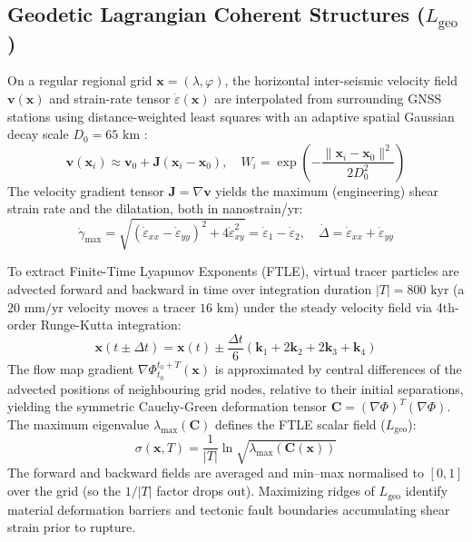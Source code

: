 \documentclass[11pt,a4paper]{article}
\begin{document}
\subsection{Geodetic Lagrangian Coherent Structures (\texorpdfstring{$L_{\text{geo}}$}{L\_geo})}
On a regular regional grid $\mathbf{x} = (\lambda, \varphi)$, the horizontal inter-seismic velocity field $\mathbf{v}(\mathbf{x})$ and strain-rate tensor $\dot{\varepsilon}(\mathbf{x})$ are interpolated from surrounding GNSS stations using distance-weighted least squares with an adaptive spatial Gaussian decay scale $D_0 = 65\text{ km}$ \cite{shen1996}:
\begin{equation}
\mathbf{v}(\mathbf{x}_i) \approx \mathbf{v}_0 + \mathbf{J} (\mathbf{x}_i - \mathbf{x}_0), \quad W_i = \exp\left( - \frac{\|\mathbf{x}_i - \mathbf{x}_0\|^2}{2 D_0^2} \right)
\end{equation}
The velocity gradient tensor $\mathbf{J} = \nabla \mathbf{v}$ yields the maximum (engineering) shear strain rate and the dilatation, both in nanostrain/yr:
\begin{equation}
\dot{\gamma}_{\max} = \sqrt{(\dot{\varepsilon}_{xx} - \dot{\varepsilon}_{yy})^2 + 4\dot{\varepsilon}_{xy}^2} = \dot{\varepsilon}_1 - \dot{\varepsilon}_2, \quad \dot{\Delta} = \dot{\varepsilon}_{xx} + \dot{\varepsilon}_{yy}
\end{equation}

To extract Finite-Time Lyapunov Exponents (FTLE), virtual tracer particles are advected forward and backward in time over integration duration $|T| = 800\text{ kyr}$ (a $20\text{ mm/yr}$ velocity moves a tracer $16\text{ km}$) under the steady velocity field via 4th-order Runge-Kutta integration:
\begin{equation}
\mathbf{x}(t \pm \Delta t) = \mathbf{x}(t) \pm \frac{\Delta t}{6}(\mathbf{k}_1 + 2\mathbf{k}_2 + 2\mathbf{k}_3 + \mathbf{k}_4)
\end{equation}
The flow map gradient $\nabla \Phi_{t_0}^{t_0+T}(\mathbf{x})$ is approximated by central differences of the advected positions of neighbouring grid nodes, relative to their initial separations, yielding the symmetric Cauchy-Green deformation tensor $\mathbf{C} = (\nabla \Phi)^T (\nabla \Phi)$. The maximum eigenvalue $\lambda_{\max}(\mathbf{C})$ defines the FTLE scalar field ($L_{\text{geo}}$):
\begin{equation}
\sigma(\mathbf{x}, T) = \frac{1}{|T|} \ln \sqrt{\lambda_{\max}(\mathbf{C}(\mathbf{x}))}
\end{equation}
The forward and backward fields are averaged and min--max normalised to $[0, 1]$ over the grid (so the $1/|T|$ factor drops out). Maximizing ridges of $L_{\text{geo}}$ identify material deformation barriers and tectonic fault boundaries accumulating shear strain prior to rupture.
\end{document}
